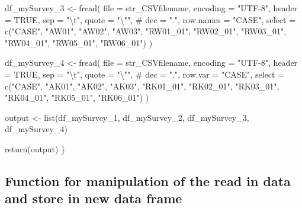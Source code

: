 \documentclass[
]{article}
\newenvironment{Shaded}{\begin{snugshade}}{\end{snugshade}}
\newcommand{\AttributeTok}[1]{\textcolor[rgb]{0.00,0.34,0.68}{#1}}
\newcommand{\CommentTok}[1]{\textcolor[rgb]{0.54,0.53,0.53}{#1}}
\newcommand{\ConstantTok}[1]{\textcolor[rgb]{0.67,0.33,0.00}{#1}}
\newcommand{\FunctionTok}[1]{\textcolor[rgb]{0.39,0.29,0.61}{#1}}
\newcommand{\NormalTok}[1]{\textcolor[rgb]{0.12,0.11,0.11}{#1}}
\newcommand{\OtherTok}[1]{\textcolor[rgb]{0.00,0.43,0.16}{#1}}
\newcommand{\SpecialCharTok}[1]{\textcolor[rgb]{0.24,0.68,0.91}{#1}}
\newcommand{\StringTok}[1]{\textcolor[rgb]{0.75,0.01,0.01}{#1}}
\begin{document}
\begin{Shaded}
\begin{Highlighting}[]
\NormalTok{  df\_mySurvey\_3 }\OtherTok{\textless{}{-}} \FunctionTok{fread}\NormalTok{(}
    \AttributeTok{file =}\NormalTok{ str\_CSVfilename, }\AttributeTok{encoding =} \StringTok{"UTF{-}8"}\NormalTok{,}
    \AttributeTok{header =} \ConstantTok{TRUE}\NormalTok{, }\AttributeTok{sep =} \StringTok{"}\SpecialCharTok{\textbackslash{}t}\StringTok{"}\NormalTok{, }\AttributeTok{quote =} \StringTok{"}\SpecialCharTok{\textbackslash{}"}\StringTok{"}\NormalTok{,}
    \CommentTok{\# dec = ".", row.names = "CASE",}
    \AttributeTok{select =} \FunctionTok{c}\NormalTok{(}\StringTok{"CASE"}\NormalTok{, }\StringTok{"AW01"}\NormalTok{, }\StringTok{"AW02"}\NormalTok{, }\StringTok{"AW03"}\NormalTok{, }
               \StringTok{"RW01\_01"}\NormalTok{, }\StringTok{"RW02\_01"}\NormalTok{, }\StringTok{"RW03\_01"}\NormalTok{, }\StringTok{"RW04\_01"}\NormalTok{, }\StringTok{"RW05\_01"}\NormalTok{, }\StringTok{"RW06\_01"}\NormalTok{)}
\NormalTok{    )}
  
\NormalTok{  df\_mySurvey\_4 }\OtherTok{\textless{}{-}} \FunctionTok{fread}\NormalTok{(}
    \AttributeTok{file =}\NormalTok{ str\_CSVfilename, }\AttributeTok{encoding =} \StringTok{"UTF{-}8"}\NormalTok{,}
    \AttributeTok{header =} \ConstantTok{TRUE}\NormalTok{, }\AttributeTok{sep =} \StringTok{"}\SpecialCharTok{\textbackslash{}t}\StringTok{"}\NormalTok{, }\AttributeTok{quote =} \StringTok{"}\SpecialCharTok{\textbackslash{}"}\StringTok{"}\NormalTok{,}
    \CommentTok{\# dec = ".", row.var = "CASE",}
    \AttributeTok{select =} \FunctionTok{c}\NormalTok{(}\StringTok{"CASE"}\NormalTok{, }\StringTok{"AK01"}\NormalTok{, }\StringTok{"AK02"}\NormalTok{, }\StringTok{"AK03"}\NormalTok{, }
               \StringTok{"RK01\_01"}\NormalTok{, }\StringTok{"RK02\_01"}\NormalTok{, }\StringTok{"RK03\_01"}\NormalTok{, }\StringTok{"RK04\_01"}\NormalTok{, }\StringTok{"RK05\_01"}\NormalTok{, }\StringTok{"RK06\_01"}\NormalTok{)}
\NormalTok{    )}
  
\NormalTok{  output }\OtherTok{\textless{}{-}} \FunctionTok{list}\NormalTok{(df\_mySurvey\_1, df\_mySurvey\_2, df\_mySurvey\_3, df\_mySurvey\_4)}
  
  \FunctionTok{return}\NormalTok{(output)}
\NormalTok{\}}
\end{Highlighting}
\end{Shaded}

\hypertarget{function-for-manipulation-of-the-read-in-data-and-store-in-new-data-frame}{%
\subsection{Function for manipulation of the read in data and store in
new data
frame}\label{function-for-manipulation-of-the-read-in-data-and-store-in-new-data-frame}}
\end{document}
